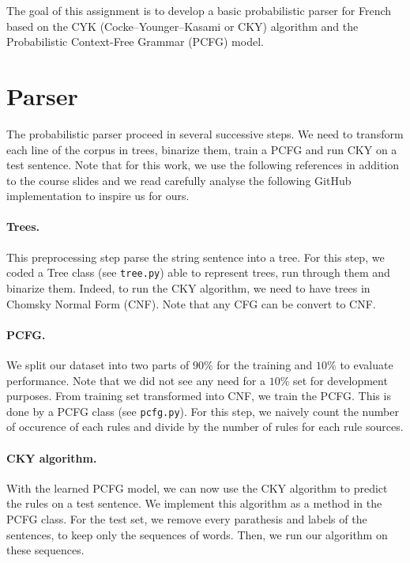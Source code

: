 \documentclass[11pt]{article}
\begin{document}
\maketitle 

The goal of this assignment is to develop a basic probabilistic parser for French based on the CYK (Cocke–Younger–Kasami or CKY) algorithm and the Probabilistic Context-Free Grammar (PCFG) model.

\section{Parser} %
\label{sec:parser}

The probabilistic parser proceed in several successive steps. We need to transform each line of the corpus in trees, binarize them, train a PCFG and run CKY on a test sentence. Note that for this work, we use the following references \cite{jurafsky2000speech,collinspcfg} in addition to the course slides and we read carefully analyse the following GitHub \cite{aetilleyGitHub} implementation to inspire us for ours.
  

  \paragraph{Trees.} %
  \label{par:trees}
  This preprocessing step parse the string sentence into a tree. For this step, we coded a Tree class (see \texttt{tree.py}) able to represent trees, run through them and binarize them. Indeed, to run the CKY algorithm, we need to have trees in Chomsky Normal Form (CNF). Note that any CFG can be convert to CNF.

  \paragraph{PCFG.} %
  \label{par:pcfg}
  We split our dataset into two parts of $90\%$ for the training and $10\%$ to evaluate performance. Note that we did not see any need for a $10\%$ set for development purposes.
  From training set transformed into CNF, we train the PCFG. This is done by a PCFG class (see \texttt{pcfg.py}). For this step, we naively count the number of occurence of each rules and divide by the number of rules for each rule sources.

  \paragraph{CKY algorithm.} %
  \label{par:cky_algorithm_}
  With the learned PCFG model, we can now use the CKY algorithm to predict the rules on a test sentence. We implement this algorithm as a method in the PCFG class. For the test set, we remove every parathesis and labels of the sentences, to keep only the sequences of words. Then, we run our algorithm on these sequences.
\end{document}
